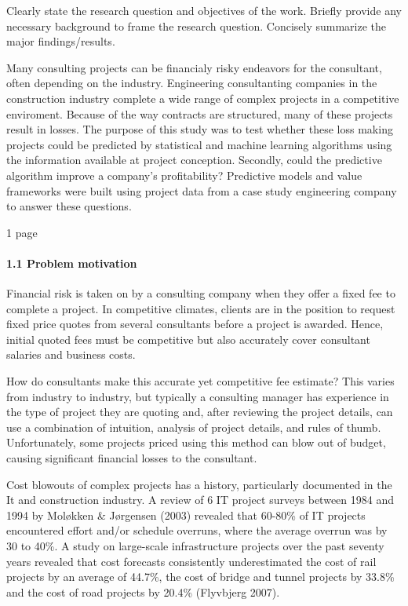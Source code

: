 \documentclass[]{elsarticle} %
\begin{document}
Clearly state the research question and objectives of the work. Briefly
provide any necessary background to frame the research question.
Concisely summarize the major findings/results.

Many consulting projects can be financialy risky endeavors for the
consultant, often depending on the industry. Engineering consultanting
companies in the construction industry complete a wide range of complex
projects in a competitive enviroment. Because of the way contracts are
structured, many of these projects result in losses. The purpose of this
study was to test whether these loss making projects could be predicted
by statistical and machine learning algorithms using the information
available at project conception. Secondly, could the predictive
algorithm improve a company's profitability? Predictive models and value
frameworks were built using project data from a case study engineering
company to answer these questions.

1 page

\paragraph{1.1 Problem motivation}\label{problem-motivation}

Financial risk is taken on by a consulting company when they offer a
fixed fee to complete a project. In competitive climates, clients are in
the position to request fixed price quotes from several consultants
before a project is awarded. Hence, initial quoted fees must be
competitive but also accurately cover consultant salaries and business
costs.

How do consultants make this accurate yet competitive fee estimate? This
varies from industry to industry, but typically a consulting manager has
experience in the type of project they are quoting and, after reviewing
the project details, can use a combination of intuition, analysis of
project details, and rules of thumb. Unfortunately, some projects priced
using this method can blow out of budget, causing significant financial
losses to the consultant.

Cost blowouts of complex projects has a history, particularly documented
in the It and construction industry. A review of 6 IT project surveys
between 1984 and 1994 by Moløkken \& Jørgensen (2003) revealed that
60-80\% of IT projects encountered effort and/or schedule overruns,
where the average overrun was by 30 to 40\%. A study on large-scale
infrastructure projects over the past seventy years revealed that cost
forecasts consistently underestimated the cost of rail projects by an
average of 44.7\%, the cost of bridge and tunnel projects by 33.8\% and
the cost of road projects by 20.4\% (Flyvbjerg 2007).
\end{document}
